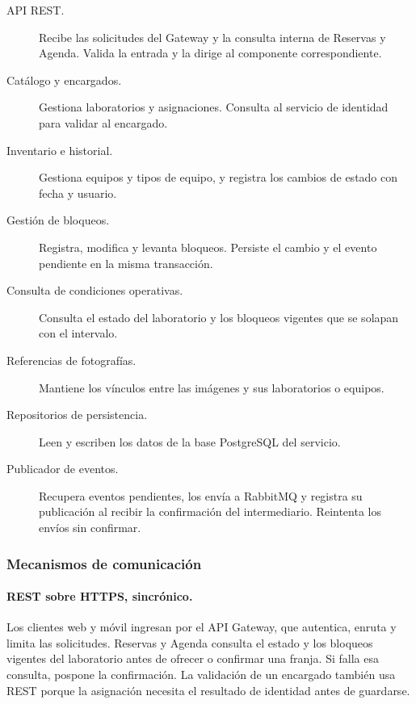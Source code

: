 \begin{description}
    \item[API REST.] Recibe las solicitudes del Gateway y la consulta
    interna de Reservas y Agenda. Valida la entrada y la dirige al componente
    correspondiente.
    \item[Catálogo y encargados.] Gestiona laboratorios y asignaciones.
    Consulta al servicio de identidad para validar al encargado.
    \item[Inventario e historial.] Gestiona equipos y tipos de equipo,
    y registra los cambios de estado con fecha y usuario.
    \item[Gestión de bloqueos.] Registra, modifica y levanta bloqueos.
    Persiste el cambio y el evento pendiente en la misma transacción.
    \item[Consulta de condiciones operativas.] Consulta el estado del
    laboratorio y los bloqueos vigentes que se solapan con el intervalo.
    \item[Referencias de fotografías.] Mantiene los vínculos entre las
    imágenes y sus laboratorios o equipos.
    \item[Repositorios de persistencia.] Leen y escriben los datos de la
    base PostgreSQL del servicio.
    \item[Publicador de eventos.] Recupera eventos pendientes, los envía
    a RabbitMQ y registra su publicación al recibir la confirmación del
    intermediario. Reintenta los envíos sin confirmar.
\end{description}

\subsubsection{Mecanismos de comunicación}

\paragraph{REST sobre HTTPS, sincrónico.}
Los clientes web y móvil ingresan por el API Gateway, que autentica,
enruta y limita las solicitudes. Reservas y Agenda consulta el estado y
los bloqueos vigentes del laboratorio antes de ofrecer o confirmar una
franja. Si falla esa consulta, pospone la confirmación. La validación de
un encargado también usa REST porque la asignación necesita el resultado
de identidad antes de guardarse.

